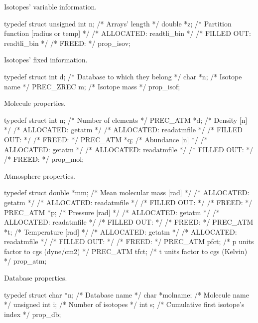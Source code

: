 \documentclass[letterpaper,12pt]{article}
\begin{document}
\noindent \newline
Isotopes' variable information.
\begin{plain}
typedef struct {    
  unsigned int n;   /* Arrays' length                                       */
  double *z;        /* Partition function [radius or temp]                  */
    /* ALLOCATED:	readtli_bin					    */
    /* FILLED OUT:	readtli_bin					    */
    /* FREED: 								    */ 
} prop_isov;
\end{plain}
\noindent \newline
Isotopes' fixed information.
\begin{plain}
typedef struct {    
  int d;            /*  Database to which they belong */
  char *n;          /*  Isotope name                  */
  PREC_ZREC m;      /*  Isotope mass                  */
} prop_isof;
\end{plain}
\noindent \newline
Molecule properties.
\begin{plain}
typedef struct{   
  int n;           /*  Number of elements      */
  PREC_ATM *d;     /*  Density   [n]           */
    /* ALLOCATED:	getatm						    */
    /* ALLOCATED:	readatmfile					    */
    /* FILLED OUT:							    */
    /* FREED: 								    */ 
  PREC_ATM *q;     /*  Abundance [n]           */
    /* ALLOCATED:	getatm						    */
    /* ALLOCATED:	readatmfile					    */
    /* FILLED OUT:							    */
    /* FREED: 								    */ 
} prop_mol;
\end{plain}
\noindent \newline
Atmosphere properties.
\begin{plain}
typedef struct {    
  double *mm;       /*  Mean molecular mass [rad]        */
    /* ALLOCATED:	getatm						    */
    /* ALLOCATED:	readatmfile					    */
    /* FILLED OUT:							    */
    /* FREED: 								    */ 
  PREC_ATM *p;      /*  Pressure    [rad]                */
    /* ALLOCATED:	getatm						    */
    /* ALLOCATED:	readatmfile					    */
    /* FILLED OUT:							    */
    /* FREED: 								    */ 
  PREC_ATM *t;      /*  Temperature [rad]                */
    /* ALLOCATED:	getatm						    */
    /* ALLOCATED:	readatmfile					    */
    /* FILLED OUT:							    */
    /* FREED: 								    */ 
  PREC_ATM pfct;    /*  p units factor to cgs (dyne/cm2) */
  PREC_ATM tfct;    /*  t units factor to cgs (Kelvin)   */
} prop_atm;
\end{plain}
\noindent \newline
Database properties.
\begin{plain}
typedef struct {    
  char *n;          /*  Database name                                        */
  char *molname;    /*  Molecule name                                        */
  unsigned int i;   /*  Number of isotopes                                   */
  int s;            /*  Cumulative first isotope's index                     */
} prop_db;
\end{plain}
\end{document}
